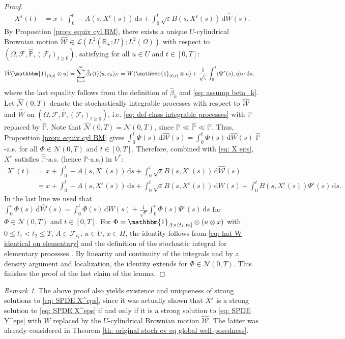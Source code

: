 \documentclass{amsart}
\newcommand{\dd}{\,\mathrm{d}}
\newcommand{\one}{\mathbbm{1}}
\newcommand{\<}{\langle}
\newcommand{\?}{\rangle}
\theoremstyle{plain}
\theoremstyle{remark}
\newtheorem{remark}[theorem]{Remark}
\theoremstyle{plain}
\numberwithin{equation}{section}
\def\R{{\mathbb R}}
\newcommand{\F}{\mathcal{F}}
\renewcommand{\P}{\mathbb{P}}
\newcommand{\Om}{\Omega}
\newcommand{\eps}{\varepsilon}
\begin{document}
\begin{proof}
\begin{align}
    {X}^\eps(t)&=x+\int_0^t -A(s,{X}^\eps(s))\dd s+\int_0^t\sqrt{\eps}B(s,{X}^\eps(s))\dd \hat{W}(s).
\end{align}
By Proposition \ref{prop: equiv cyl BM}, there exists a unique $U$-cylindrical Brownian motion $\hat{\mathcal{W}}\in \mathcal{L}(L^2(\R_+;U);L^2(\Om))$ with respect to $(\Om,\F,\hat{\P},(\F_t)_{t\geq 0})$, satisfying for all $u\in U$ and $t\in[0,T]$:
\begin{align}
  \hat{\mathcal{W}}(\one_{(0,t]}\otimes u)=\sum_{k=1}^\infty \hat{\beta}_k(t)\<u,e_k\?_U
  &= W(\one_{(0,t]}\otimes u)+\frac{1}{\sqrt{\eps}}\int_0^t \<\Psi^\eps(s),u\?_U\dd s, \label{eq: hat W identical on elementary}
  \end{align}
where the last equality follows from the definition of $\hat{\beta}_k$ and  \eqref{eq: assump beta_k}.
Let $\hat{\mathcal{N}}(0,T)$ denote the stochastically integrable processes with respect to $\hat{\mathcal{W}}$ and $\hat{W}$ on $(\Om,\F,\hat{\P},(\F_t)_{t\geq 0})$, i.e. \eqref{eq: def class integrable processes} with $\P$ replaced by $\hat{\P}$. Note that $\hat{\mathcal{N}}(0,T)=\mathcal{N}(0,T)$, since $\P\ll\hat{\P}\ll\P$.
Thus, Proposition \ref{prop: equiv cyl BM} gives $\int_0^t \Phi(s)\dd \hat{\mathcal{W}}(s)=\int_0^t \Phi(s)\dd \hat{W}(s)$
$\hat{\P}$-a.s.  \!for all $\Phi\in \mathcal{N}(0,T)$
and $t\in[0,T]$.  Therefore, combined with \eqref{eq: X eps},  ${X}^\eps$ satisfies $\hat{\P}$-a.s. \!(hence $\P$-a.s.) in $V^*$:
\begin{align*}
    {X}^\eps(t)&=x+\int_0^t -A(s,{X}^\eps(s))\dd s+\int_0^t\sqrt{\eps}B(s,{X}^\eps(s))\dd \hat{\mathcal{W}}(s)\\
    &=x+\int_0^t -A(s,{X}^\eps(s))\dd s+\int_0^t\sqrt{\eps}B(s,{X}^\eps(s))\dd W(s)+\int_0^tB(s,{X}^\eps(s))\Psi^{\eps}(s)\dd s.
\end{align*}
In the last line we used that $\int_0^t\Phi(s)\dd \hat{\mathcal{W}}(s)  =\int_0^t\Phi(s)\dd {W}(s) +\frac{1}{\sqrt{\eps}}\int_0^t\Phi(s)\Psi^\eps(s)\dd s$ for $\Phi\in \mathcal{N}(0,T)$ and $t\in[0,T]$.
For $\Phi= \one_{A\times (t_1,t_2]}\otimes(u\otimes x)$ with $0\leq t_1<t_2\leq T$, $A\in\F_{t_1}$, $u\in U$, $x\in H$,
the identity follows from \eqref{eq: hat W identical on elementary} and the definition of the stochastic integral for elementary processes \cite[p. 305]{NVW15}.  By linearity and continuity of the integrals and by a density argument  and localization, the identity extends for $\Phi\in \mathcal{N}(0,T)$.
This finishes the proof of the last claim of the lemma.
\end{proof}
\begin{remark}
The above proof also yields existence and uniqueness of strong solutions to \eqref{eq: SPDE X^eps}, since it was actually shown that $X^\eps$ is a strong solution to \eqref{eq: SPDE X^eps} if and only if it is a strong solution to \eqref{eq: SPDE Y^eps} with $W$ replaced by the $U$-cylindrical Brownian motion $\hat{\mathcal{W}}$. The latter was already considered in Theorem \ref{th: original stoch ev eq global well-posedness}.
\end{remark}
\end{document}
